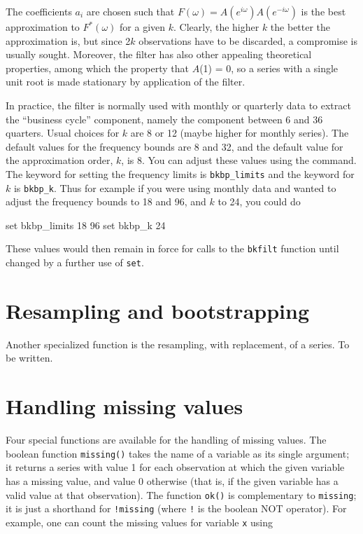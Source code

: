 The coefficients $a\ensuremath{_{i}}$ are chosen such that $F(\omega)
= A(e^{i\omega})A(e^{-i\omega})$ is the best approximation to
$F^*(\omega)$ for a given $k$. Clearly, the higher $k$ the better the
approximation is, but since 2$k$ observations have to be discarded, a
compromise is usually sought. Moreover, the filter has also other
appealing theoretical properties, among which the property that $A$(1)
= 0, so a series with a single unit root is made stationary by
application of the filter.

In practice, the filter is normally used with monthly or quarterly
data to extract the ``business cycle'' component, namely the component
between 6 and 36 quarters. Usual choices for $k$ are 8 or 12 (maybe
higher for monthly series).  The default values for the frequency
bounds are 8 and 32, and the default value for the approximation
order, $k$, is 8. You can adjust these values using the 
command. The keyword for setting the frequency limits is
\verb+bkbp_limits+ and the keyword for $k$ is \verb+bkbp_k+.  Thus for
example if you were using monthly data and wanted to adjust the
frequency bounds to 18 and 96, and $k$ to 24, you could do

\begin{code}
	set bkbp_limits 18 96
	set bkbp_k 24
\end{code}

These values would then remain in force for calls to the \verb+bkfilt+
function until changed by a further use of \verb+set+.
      

\section{Resampling and bootstrapping}
\label{genr-resample}

Another specialized function is the resampling, with replacement, of a
series.  To be written.
    

\section{Handling missing values}
\label{genr-missing}

Four special functions are available for the handling of missing
values.  The boolean function \verb+missing()+ takes the name of a
variable as its single argument; it returns a series with value 1 for
each observation at which the given variable has a missing value, and
value 0 otherwise (that is, if the given variable has a valid value at
that observation).  The function \verb+ok()+ is complementary to
\verb+missing+; it is just a shorthand for \verb+!missing+ (where
\verb+!+ is the boolean NOT operator).  For example, one can count the
missing values for variable \verb+x+ using

